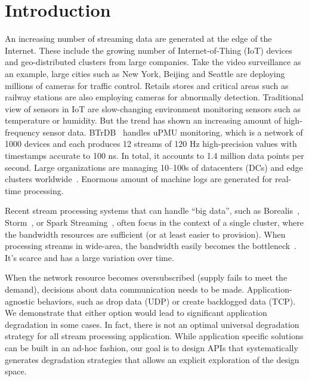 \section{Introduction}
\label{sec:introduction}

An increasing number of streaming data are generated at the edge of the
Internet. These include the growing number of Internet-of-Thing (IoT) devices
and geo-distributed clusters from large companies. Take the video surveillance
as an example, large cities such as New York, Beijing and Seattle are deploying
millions of cameras for traffic control. Retails stores and critical areas such
as railway stations are also employing cameras for abnormally
detection. Traditional view of sensors in IoT are slow-changing environment
monitoring sensors such as temperature or humidity. But the trend has shown an
increasing amount of high-frequency sensor data. BTrDB~\cite{andersen2016btrdb}
handles uPMU monitoring, which is a network of 1000 devices and each produces 12
streams of 120 Hz high-precision values with timestamps accurate to 100 ns. In
total, it accounts to 1.4 million data points per second. Large organizations
are managing 10--100s of datacenters (DCs) and edge clusters
worldwide~\cite{calder2013mapping}. Enormous amount of machine logs are
generated for real-time processing.

Recent stream processing systems that can handle ``big data'', such as
Borealis~\cite{abadi2005design}, Storm~\cite{toshniwal2014storm}, or Spark
Streaming~\cite{zaharia2012discretized}, often focus in the context of a single
cluster, where the bandwidth resources are sufficient (or at least easier to
provision). When processing streams in wide-area, the bandwidth easily becomes
the bottleneck~\cite{rabkin2014aggregation}. It's scarce and has a large
variation over time.

When the network resource becomes oversubscribed (supply fails to meet the
demand), decisions about data communication needs to be
made. Application-agnostic behaviors, such as drop data (UDP) or create
backlogged data (TCP).
We demonstrate that either option would lead to significant application
degradation in some cases. In fact, there is not an optimal universal
degradation strategy for all stream processing application. While application
specific solutions can be built in an ad-hoc fashion, our goal is to design APIs
that systematically generates degradation strategies that allows an explicit
exploration of the design space.

